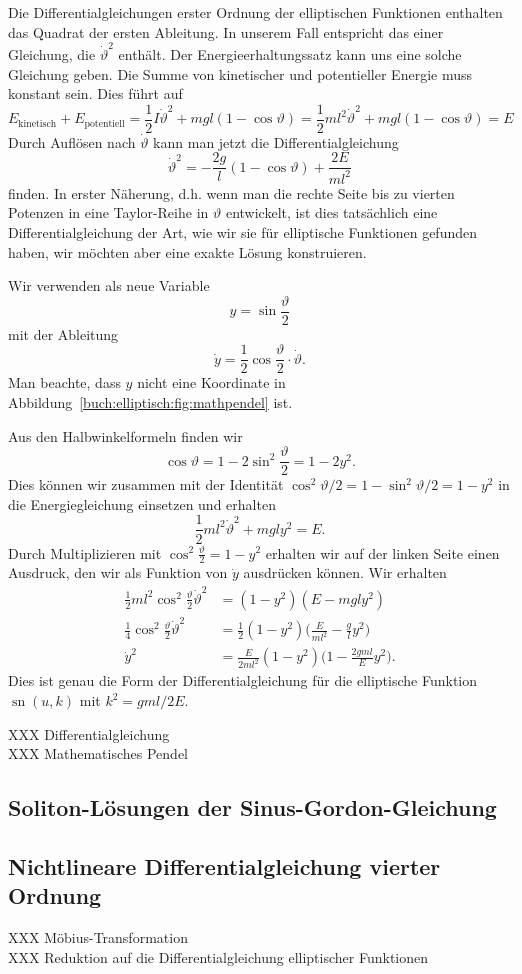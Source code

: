 Die Differentialgleichungen erster Ordnung der elliptischen Funktionen
enthalten das Quadrat der ersten Ableitung.
In unserem Fall entspricht das einer Gleichung, die $\dot{\vartheta}^2$
enthält.
Der Energieerhaltungssatz kann uns eine solche Gleichung geben.
Die Summe von kinetischer und potentieller Energie muss konstant sein.
Dies führt auf
\[
E_{\text{kinetisch}}
+
E_{\text{potentiell}}
=
\frac12I\dot{\vartheta}^2
+
mgl(1-\cos\vartheta)
=
\frac12ml^2\dot{\vartheta}^2
+
mgl(1-\cos\vartheta)
=
E
\]
Durch Auflösen nach $\dot{\vartheta}$ kann man jetzt die
Differentialgleichung
\[
\dot{\vartheta}^2
=
-
\frac{2g}{l}(1-\cos\vartheta)
+\frac{2E}{ml^2}
\]
finden.
In erster Näherung, d.h. wenn man die rechte Seite bis zu vierten
Potenzen in eine Taylor-Reihe in $\vartheta$ entwickelt,  ist dies
tatsächlich eine Differentialgleichung der Art, wie wir sie für
elliptische Funktionen gefunden haben, wir möchten aber eine exakte
Lösung konstruieren.

Wir verwenden als neue Variable 
\[
y = \sin\frac{\vartheta}2
\]
mit der Ableitung
\[
\dot{y}=\frac12\cos\frac{\vartheta}{2}\cdot \dot{\vartheta}.
\]
Man beachte, dass $y$ nicht eine Koordinate in
Abbildung~\ref{buch:elliptisch:fig:mathpendel} ist.

Aus den Halbwinkelformeln finden wir
\[
\cos\vartheta
=
1-2\sin^2 \frac{\vartheta}2
=
1-2y^2.
\]
Dies können wir zusammen mit der
Identität $\cos^2\vartheta/2 = 1-\sin^2\vartheta/2 = 1-y^2$
in die Energiegleichung einsetzen und erhalten
\[
\frac12ml^2\dot{\vartheta}^2 + mgly^2 = E.
\]
Durch Multiplizieren mit $\cos^2\frac{\vartheta}{2}=1-y^2$
erhalten wir auf der linken Seite einen Ausdruck, den wir
als Funktion von $\dot{y}$ ausdrücken können.
Wir erhalten
\begin{align*}
\frac12ml^2
\cos^2\frac{\vartheta}2
\dot{\vartheta}^2
&=
(1-y^2)
(E -mgly^2)
\\
\frac{1}{4}\cos^2\frac{\vartheta}{2}\dot{\vartheta}^2
&=
\frac{1}{2}
(1-y^2)
\biggl(\frac{E}{ml^2} -\frac{g}{l}y^2\biggr)
\\
\dot{y}^2
&=
\frac{E}{2ml^2}
(1-y^2)\biggl(
1-\frac{2gml}{E}y^2
\biggr).
\end{align*}
Dies ist genau die Form der Differentialgleichung für die elliptische
Funktion $\operatorname{sn}(u,k)$
mit $k^2 = gml/2E$.

XXX Differentialgleichung \\
XXX Mathematisches Pendel \\

\subsection{Soliton-Lösungen der Sinus-Gordon-Gleichung}

\subsection{Nichtlineare Differentialgleichung vierter Ordnung}
XXX Möbius-Transformation \\
XXX Reduktion auf die Differentialgleichung elliptischer Funktionen
